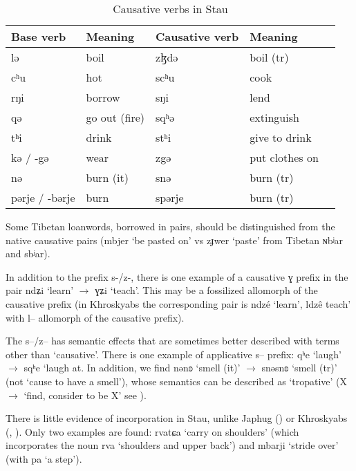 \documentclass[oneside,a4paper,11pt]{article}
\newcommand{\ipa}[1]{{\phon #1}} %
\begin{document}
 
   \begin{table}[H]
 \caption{Causative verbs in Stau} \label{tab:causative} \centering 
\begin{tabular}{lllll}
\toprule
Base verb & Meaning & Causative verb & Meaning \\
\midrule
 \ipa{lə}  &boil& \ipa{zɮdə}& boil (tr)\\
  \ipa{cʰu}  & hot &  \ipa{scʰu}& cook \\
    \ipa{rŋi}  & borrow &  \ipa{sŋi}& lend \\
    \ipa{qə}  & go out (fire) &  \ipa{sqʰə}& extinguish\\
    \ipa{tʰi}  & drink &  \ipa{stʰi} & give to drink\\
    \ipa{kə} / \ipa{-gə} & wear &  \ipa{zgə} & put clothes on \\
     \ipa{nə}  & burn (it) &  \ipa{snə}& burn (tr)\\
     \ipa{pərje} / \ipa{-bərje} & burn &  \ipa{spərje} & burn (tr)\\
 \bottomrule
\end{tabular}
\end{table}

Some Tibetan  loanwords, borrowed in pairs, should be distinguished from the native causative pairs (\ipa{mbjer} `be pasted on' vs \ipa{zɟwer}  `paste' from Tibetan \ipa{ɴbʲar} and \ipa{sbʲar}).
 
 
 In addition to the prefix \ipa{s-/z-}, there is one example of a causative \ipa{ɣ} prefix in the pair   \ipa{ndʑi} `learn'    $\rightarrow$  \ipa{ɣʑi} `teach'. This may be a fossilized allomorph of the causative prefix (in Khroskyabs the corresponding pair is \ipa{ndzé} `learn', \ipa{ldzê}  teach' with \ipa{l--} allomorph of the causative prefix).
     
The \ipa{s--/z--} has semantic effects that are sometimes better described with terms other than `causative'. There is one example of applicative \ipa{s--} prefix: \ipa{qʰe}  `laugh' $\rightarrow$ \ipa{sqʰe} `laugh at. In addition, we find \ipa{nənʚ}  `smell (it)' $\rightarrow$ \ipa{snəsnʚ} `smell (tr)' (not `cause to have a smell'), whose semantics can be described as `tropative' (X $\rightarrow$ `find, consider to be X' see \citealt{jacques13tropative}).
 
 
 There is little evidence of incorporation in Stau, unlike Japhug (\citealt{jacques12incorp}) or Khroskyabs (\citealt{lai13affixale}, \citealt{lai14person}). Only two examples are found: \ipa{rvatɕa} `carry on shoulders' (which incorporates the noun \ipa{rva} `shoulders and upper back') and \ipa{mbarji} `stride over' (with \ipa{pa}  `a step').
\end{document}
